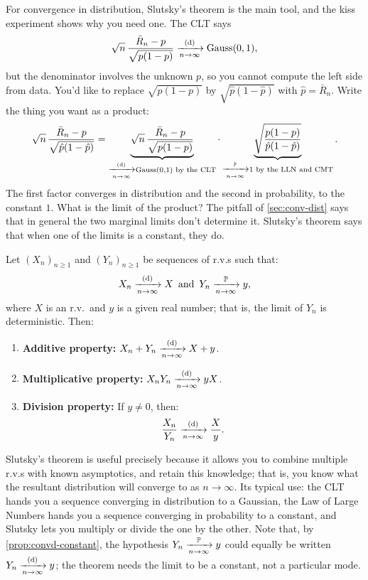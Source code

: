 For convergence in distribution, Slutsky's theorem is the main tool, and the kiss experiment shows why you need one.
The CLT says
\[
\sqrt{n} \, \frac{\bar{R}_n - p}{\sqrt{p(1-p)}} \xrightarrow [n \to \infty ]{\text{(d)}} \text{Gauss}(0,1),
\]
but the denominator involves the unknown $p$, so you cannot compute the left side from data.
You'd like to replace $\sqrt{p(1-p)}$ by $\sqrt{\hat{p}(1 - \hat{p})}$ with $\hat{p} = \bar{R}_n$.
Write the thing you want as a product:
\[
\sqrt{n} \, \frac{\bar{R}_n - p}{\sqrt{\hat{p}(1-\hat{p})}} = \underbrace{\sqrt{n} \, \frac{\bar{R}_n - p}{\sqrt{p(1-p)}}}_{\xrightarrow [n \to \infty ]{\text{(d)}} \text{Gauss}(0,1) \text{ by the CLT}} \cdot \underbrace{\sqrt{\frac{p(1-p)}{\hat{p}(1-\hat{p})}}}_{\xrightarrow [n \to \infty ]{\mathbb{P}} 1 \text{ by the LLN and CMT}}.
\]
The first factor converges in distribution and the second in probability, to the constant $1$.
What is the limit of the product?
The pitfall of \cref{sec:conv-dist} says that in general the two marginal limits don't determine it.
Slutsky's theorem says that when one of the limits is a constant, they do.

\begin{theorem}[Slutsky]
\label{thm:slutsky}
Let $(X_n)_{n \geq 1}$ and $(Y_n)_{n \geq 1}$ be sequences of r.v.s such that:
\[
X_n \xrightarrow [n \to \infty ]{\text{(d)}} X \, \text{ and } \, Y_n \xrightarrow [n \to \infty ]{\mathbb{P}} y,
\]
where $X$ is an r.v.\ and $y$ is a given real number;
that is, the limit of $Y_n$ is deterministic.
Then:
\begin{enumerate}
\item \textbf{Additive property:} $X_n + Y_n \xrightarrow [n \to \infty ]{\text{(d)}} X + y$.

\item \textbf{Multiplicative property:} $X_n Y_n \xrightarrow [n \to \infty ]{\text{(d)}} yX$.

\item \textbf{Division property:} If $y \neq 0$, then:
\[
\frac{X_n}{Y_n} \xrightarrow [n \to \infty ]{\text{(d)}} \frac{X}{y}.
\]
\end{enumerate}
\end{theorem}

Slutsky's theorem is useful precisely because it allows you to combine multiple r.v.s with known asymptotics, and retain this knowledge;
that is, you know what the resultant distribution will converge to as $n \to \infty$.
Its typical use: the CLT hands you a sequence converging in distribution to a Gaussian, the Law of Large Numbers hands you a sequence converging in probability to a constant, and Slutsky lets you multiply or divide the one by the other.
Note that, by \cref{prop:convd-constant}, the hypothesis $Y_n \xrightarrow [n \to \infty ]{\mathbb{P}} y$ could equally be written $Y_n \xrightarrow [n \to \infty ]{\text{(d)}} y$; the theorem needs the limit to be a constant, not a particular mode.

